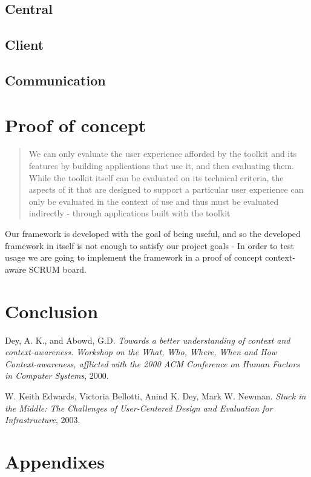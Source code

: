 \documentclass[]{report}
\begin{document}
\section{Central}

\section{Client}

\section{Communication}


\chapter{Proof of concept}

\blockquote{
We can only evaluate the user experience afforded by the toolkit and its features by building applications that use it, and then evaluating them. While the toolkit itself can be evaluated on its technical criteria, the aspects of it that are designed to support a particular user experience can only be evaluated in the context of use and thus must be evaluated indirectly - through applications built with the toolkit}\cite{Infrastructure (2003)}

Our framework is developed with the goal of being useful, and so the developed framework in itself is not enough to satisfy our project goals - In order to test usage we are going to implement the framework in a proof of concept context-aware SCRUM board.


\chapter{Conclusion}

\begin{thebibliography}{9}

  Dey, A. K., and Abowd, G.D.
  \emph{Towards a better understanding of context and context-awareness. Workshop on the What, Who, Where, When and How Context-awareness, afflicted with the 2000 ACM Conference on Human Factors in Computer Systems},
  2000.
  
  W. Keith Edwards, Victoria Bellotti, Anind K. Dey,
  Mark W. Newman.
  \emph{Stuck in the Middle: The Challenges of
  User-Centered Design and Evaluation for Infrastructure},
  2003.

\end{thebibliography}
\chapter{Appendixes}
\end{document}
